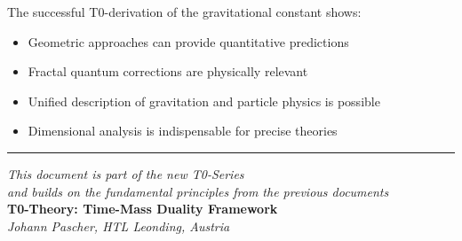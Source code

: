 \documentclass[12pt,a4paper]{article}
\begin{document}
	The successful T0-derivation of the gravitational constant shows:
	\begin{itemize}
		\item Geometric approaches can provide quantitative predictions
		\item Fractal quantum corrections are physically relevant
		\item Unified description of gravitation and particle physics is possible
		\item Dimensional analysis is indispensable for precise theories
	\end{itemize}
	
	\begin{center}
		\hrule
		\vspace{0.5cm}
		\textit{This document is part of the new T0-Series}\\
		\textit{and builds on the fundamental principles from the previous documents}\\
		\vspace{0.3cm}
		\textbf{T0-Theory: Time-Mass Duality Framework}\\
		\textit{Johann Pascher, HTL Leonding, Austria}\\
	\end{center}
	
\end{document}
